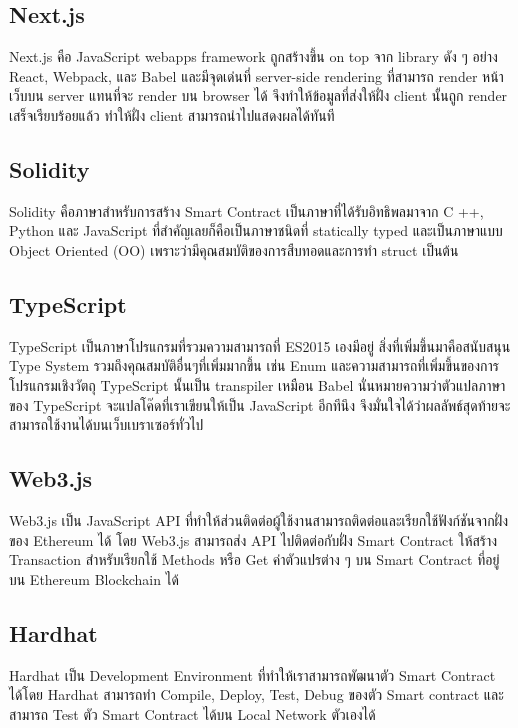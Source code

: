 \documentclass[12pt,oneside,openright,a4paper]{cpe-thai-project}
\begin{document}
\subsection{Next.js \cite{nextjs}}
\tab Next.js คือ JavaScript webapps framework ถูกสร้างขึ้น on top จาก library ดัง ๆ อย่าง React, Webpack, และ Babel และมีจุดเด่นที่ server-side rendering ที่สามารถ render หน้าเว็บบน server แทนที่จะ render บน browser ได้ จึงทำให้ข้อมูลที่ส่งให้ฝั่ง client นั้นถูก render เสร็จเรียบร้อยแล้ว ทำให้ฝั่ง client สามารถนำไปแสดงผลได้ทันที

\subsection{Solidity \cite{solidity}}
\tab Solidity คือภาษาสำหรับการสร้าง Smart Contract เป็นภาษาที่ได้รับอิทธิพลมาจาก C ++, Python และ JavaScript ที่สำคัญเลยก็คือเป็นภาษาชนิดที่ statically typed และเป็นภาษาแบบ Object Oriented (OO) เพราะว่ามีคุณสมบัติของการสืบทอดและการทำ struct เป็นต้น

\subsection{TypeScript \cite{typescript}}
\tab TypeScript เป็นภาษาโปรแกรมที่รวมความสามารถที่ ES2015 เองมีอยู่ สิ่งที่เพิ่มขึ้นมาคือสนับสนุน Type System รวมถึงคุณสมบัติอื่นๆที่เพิ่มมากขึ้น เช่น Enum และความสามารถที่เพิ่มขึ้นของการโปรแกรมเชิงวัตถุ TypeScript นั้นเป็น transpiler เหมือน Babel นั่นหมายความว่าตัวแปลภาษาของ TypeScript จะแปลโค๊ดที่เราเขียนให้เป็น JavaScript อีกทีนึง จึงมั่นใจได้ว่าผลลัพธ์สุดท้ายจะสามารถใช้งานได้บนเว็บเบราเซอร์ทั่วไป

\subsection{Web3.js \cite{web3js}}
\tab Web3.js เป็น JavaScript API ที่ทําให้ส่วนติดต่อผู้ใช้งานสามารถติดต่อและเรียกใช้ฟังก์ชันจากฝั่งของ Ethereum ได้ โดย Web3.js สามารถส่ง API ไปติดต่อกับฝั่ง Smart Contract ให้สร้าง Transaction สําหรับเรียกใช้ Methods หรือ Get ค่าตัวแปรต่าง ๆ บน Smart Contract ที่อยู่บน Ethereum Blockchain ได้
\clearpage

\subsection{Hardhat \cite{hardhat}}
\tab Hardhat เป็น Development Environment ที่ทำให้เราสามารถพัฒนาตัว Smart Contract ได้โดย Hardhat สามารถทำ Compile, Deploy, Test, Debug ของตัว Smart contract และ สามารถ Test ตัว Smart Contract ได้บน Local Network ตัวเองได้
\end{document}
